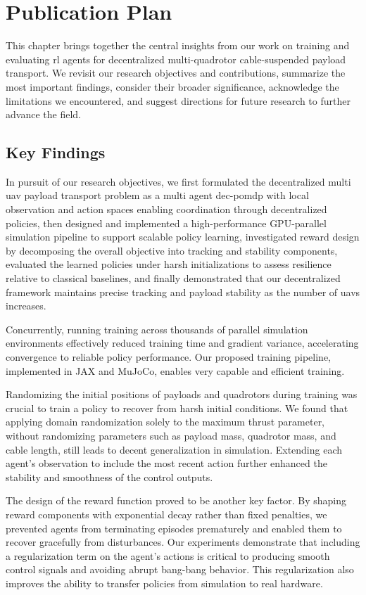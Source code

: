 \chapter{Publication Plan}
This chapter brings together the central insights from our work on training and evaluating \gls{rl} agents for decentralized multi-quadrotor cable-suspended payload transport. We revisit our research objectives and contributions, summarize the most important findings, consider their broader significance, acknowledge the limitations we encountered, and suggest directions for future research to further advance the field.

\section{Key Findings}
In pursuit of our research objectives, we first formulated the decentralized multi \gls{uav} payload transport problem as a multi agent \gls{dec-pomdp} with local observation and action spaces enabling coordination through decentralized policies, then designed and implemented a high-performance GPU-parallel simulation pipeline to support scalable policy learning, investigated reward design by decomposing the overall objective into tracking and stability components, evaluated the learned policies under harsh initializations to assess resilience relative to classical baselines, and finally demonstrated that our decentralized framework maintains precise tracking and payload stability as the number of \glspl{uav} increases.

Concurrently, running training across thousands of parallel simulation environments effectively reduced training time and gradient variance, accelerating convergence to reliable policy performance. Our proposed training pipeline, implemented in JAX and MuJoCo, enables very capable and efficient training.

Randomizing the initial positions of payloads and quadrotors during training was crucial to train a policy to recover from harsh initial conditions. We found that applying domain randomization solely to the maximum thrust parameter, without randomizing parameters such as payload mass, quadrotor mass, and cable length, still leads to decent generalization in simulation. Extending each agent's observation to include the most recent action further enhanced the stability and smoothness of the control outputs.

The design of the reward function proved to be another key factor. By shaping reward components with exponential decay rather than fixed penalties, we prevented agents from terminating episodes prematurely and enabled them to recover gracefully from disturbances. Our experiments demonstrate that including a regularization term on the agent's actions is critical to producing smooth control signals and avoiding abrupt bang-bang behavior. This regularization also improves the ability to transfer policies from simulation to real hardware. 

